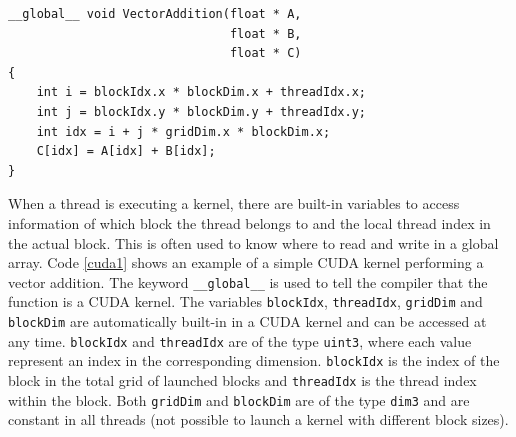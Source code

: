 \renewcommand{\lstlistingname}{Code}
\begin{lstlisting}[caption= Example of vector addition in CUDA, label=cuda1]
__global__ void VectorAddition(float * A, 
                               float * B, 
                               float * C)
{
    int i = blockIdx.x * blockDim.x + threadIdx.x;
    int j = blockIdx.y * blockDim.y + threadIdx.y;
    int idx = i + j * gridDim.x * blockDim.x;
    C[idx] = A[idx] + B[idx];
}
\end{lstlisting}

When a thread is executing a kernel, there are built-in variables to access information of which block the thread belongs to and the local thread index in the actual block. This is often used to know where to read and write in a global array. Code \ref{cuda1} shows an example of a simple CUDA kernel performing a vector addition. The keyword \texttt{\_\_global\_\_} is used to tell the compiler that the function is a CUDA kernel. The variables \texttt{blockIdx}, \texttt{threadIdx}, \texttt{gridDim} and \texttt{blockDim} are automatically built-in in a CUDA kernel and can be accessed at any time. \texttt{blockIdx} and \texttt{threadIdx} are of the type \texttt{uint3}, where each value represent an index in the corresponding dimension. \texttt{blockIdx} is the index of the block in the total grid of launched blocks and \texttt{threadIdx} is the thread index within the block. Both \texttt{gridDim} and \texttt{blockDim} are of the type \texttt{dim3} and are constant in all threads (not possible to launch a kernel with different block sizes).

